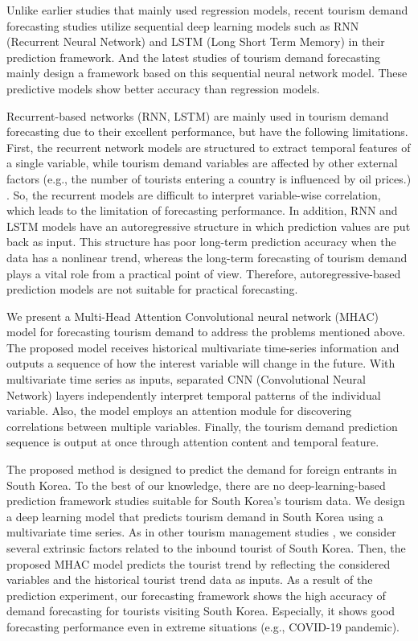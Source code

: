 \documentclass[conference]{IEEEtran}
\begin{document}
Unlike earlier studies that mainly used regression models, recent tourism demand forecasting studies \cite{zhang2019forecasting, law2019tourism} utilize sequential deep learning models such as RNN (Recurrent Neural Network) \cite{rumelhart1986learning} and LSTM (Long Short Term Memory) \cite{hochreiter1997long} in their prediction framework. And the latest studies \cite{kulshrestha2020bayesian, lu2020method} of tourism demand forecasting mainly design a framework based on this sequential neural network model. These predictive models show better accuracy than regression models.

Recurrent-based networks (RNN, LSTM) are mainly used in tourism demand forecasting due to their excellent performance, but have the following limitations. First, the recurrent network models are structured to extract temporal features of a single variable, while tourism demand variables are affected by other external factors (e.g., the number of tourists entering a country is influenced by oil prices.) \cite{law2019tourism}. So, the recurrent models are difficult to interpret variable-wise correlation, which leads to the limitation of forecasting performance. In addition, RNN and LSTM models have an autoregressive structure in which prediction values are put back as input. This structure has poor long-term prediction accuracy when the data has a nonlinear trend, whereas the long-term forecasting of tourism demand plays a vital role from a practical point of view. Therefore, autoregressive-based prediction models are not suitable for practical forecasting.

We present a Multi-Head Attention Convolutional neural network (MHAC) model for forecasting tourism demand to address the problems mentioned above. The proposed model receives historical multivariate time-series information and outputs a sequence of how the interest variable will change in the future. With multivariate time series as inputs, separated CNN (Convolutional Neural Network) layers independently interpret temporal patterns of the individual variable. Also, the model employs an attention module for discovering correlations between multiple variables. Finally, the tourism demand prediction sequence is output at once through attention content and temporal feature.

The proposed method is designed to predict the demand for foreign entrants in South Korea. To the best of our knowledge, there are no deep-learning-based prediction framework studies suitable for South Korea's tourism data. We design a deep learning model that predicts tourism demand in South Korea using a multivariate time series. As in other tourism management studies \cite{song2019review}, we consider several extrinsic factors related to the inbound tourist of South Korea. Then, the proposed MHAC model predicts the tourist trend by reflecting the considered variables and the historical tourist trend data as inputs. As a result of the prediction experiment, our forecasting framework shows the high accuracy of demand forecasting for tourists visiting South Korea. Especially, it shows good forecasting performance even in extreme situations (e.g., COVID-19 pandemic).
\end{document}
